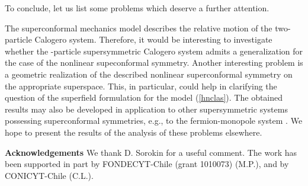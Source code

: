 \documentclass[a4paper,12pt]{article}
\begin{document}
To conclude, let us
list some problems which deserve a
further attention.

The superconformal mechanics model
describes the relative motion of the two-particle
Calogero system.
Therefore, it
would be interesting to investigate
whether the \coordHE{}-particle
supersymmetric Calogero system
\cite{FM,GT,Wyl,bgk}
admits a generalization for the case
of the nonlinear supeconformal symmetry.
Another interesting problem is a geometric
realization of the described nonlinear superconformal
symmetry on the appropriate superspace.
This, in particular, could help in clarifying
the question of
the superfield formulation for the model
(\ref{hnclas}).
The obtained results may also be
developed in application
to other supersymmetric
systems possessing superconformal symmetries,
e.g., to the fermion-monopole system \cite{HL,PMF}.
We hope to present the results of the analysis
of these problems elsewhere.



\vskip 0.5cm
{\bf Acknowledgements}
\vskip 5mm
We  thank D. Sorokin for a useful comment.
The work has been supported in part by
FONDECYT-Chile (grant 1010073) (M.P.),
and by CONICYT-Chile (C.L.).
\end{document}
